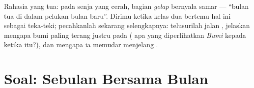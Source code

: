 \begin{exercise}[$\star\star\star$]\label{exo:g7:moon-phases:12}
Rahasia  yang tua: pada senja yang cerah, bagian \emph{gelap}
  bernyala samar --- ``bulan tua di dalam pelukan bulan
baru''. Dirimu ketika kelas dua bertemu hal ini sebagai teka-teki;
pecahkanlah sekarang selengkapnya: telusurilah jalan ,
jelaskan mengapa  bumi paling terang justru pada  
( apa yang diperlihatkan \emph{Bumi} kepada  ketika itu?),
dan mengapa ia memudar menjelang .
\end{exercise}

\section{Soal: Sebulan Bersama Bulan}

